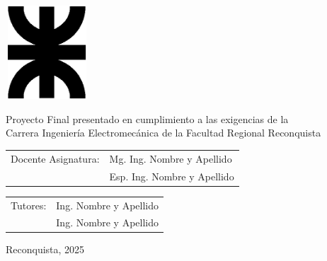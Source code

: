 \thispagestyle{toc}

\begin{center}
	\vspace*{2cm}
	\includegraphics[width=31mm,height=35mm]{imagenes/LogoUTN_nvgsb.eps}
\end{center}	
	\vspace{3cm}
	

		\begin{adjustwidth}{3cm}{0cm}
			\hspace*{1.27cm}Proyecto Final presentado en cumplimiento a las exigencias de la\\ Carrera Ingeniería Electromecánica de la Facultad Regional Reconquista\\
		\end{adjustwidth}

	
	

\vspace{7.5cm}

	\begin{tabular}{@{}p{}p{}@{}}
		Docente Asignatura: & Mg. Ing. Nombre y Apellido\\
							& Esp. Ing. Nombre y Apellido
	\end{tabular}
	
	\begin{tabular}{@{}p{}p{}@{}}
			Tutores: & Ing. Nombre y Apellido \\
					  & Ing. Nombre y Apellido
	\end{tabular}


\vfill

\begin{center}\begin{large}
		Reconquista, 2025
\end{large}\end{center}
